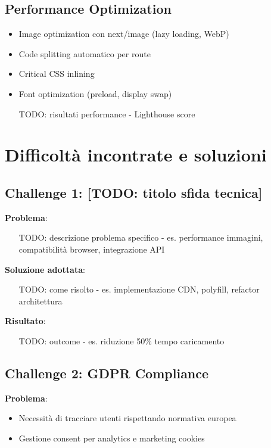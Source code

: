 \subsection{Performance Optimization}
\begin{itemize}
  \item Image optimization con next/image (lazy loading, WebP)
  \item Code splitting automatico per route
  \item Critical CSS inlining
  \item Font optimization (preload, display swap)
  \item [TODO: risultati performance - Lighthouse score]
\end{itemize}

\section{Difficoltà incontrate e soluzioni}

\subsection{Challenge 1: [TODO: titolo sfida tecnica]}
\textbf{Problema}:
\begin{itemize}
  \item [TODO: descrizione problema specifico - es. performance immagini, compatibilità browser, integrazione API]
\end{itemize}

\textbf{Soluzione adottata}:
\begin{itemize}
  \item [TODO: come risolto - es. implementazione CDN, polyfill, refactor architettura]
\end{itemize}

\textbf{Risultato}:
\begin{itemize}
  \item [TODO: outcome - es. riduzione 50\% tempo caricamento]
\end{itemize}

\subsection{Challenge 2: GDPR Compliance}
\textbf{Problema}:
\begin{itemize}
  \item Necessità di tracciare utenti rispettando normativa europea
  \item Gestione consent per analytics e marketing cookies
\end{itemize}

